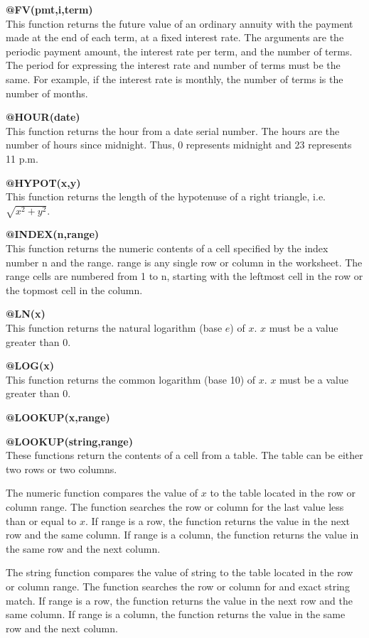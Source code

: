 {\bf @FV(pmt,i,term)}\\
    This function returns the future value of an ordinary annuity with the 
payment made at the end of each term, at a fixed interest rate.  The arguments 
are the periodic payment amount, the interest rate per term, and the number of 
terms.  The period for expressing the interest rate and number of terms must 
be the same.  For example, if the interest rate is monthly, the number of 
terms is the number of months.

{\bf @HOUR(date)}\\
    This function returns the hour from a date serial number.  The hours are 
the number of hours since midnight.  Thus, 0 represents midnight and 23 
represents 11 p.m.

{\bf @HYPOT(x,y)}\\
    This function returns the length of the hypotenuse of a right triangle, 
i.e. $\sqrt{x^2 + y^2}$.

{\bf @INDEX(n,range)}\\
    This function returns the numeric contents of a cell specified by the 
index number n and the range.  range is any single row or column in the 
worksheet.  The range cells are numbered from 1 to n, starting with the 
leftmost cell in the row or the topmost cell in the column.
 
{\bf @LN(x)}\\
    This function returns the natural logarithm (base $e$) of $x$.  
    $x$ must be a 
value greater than 0.

{\bf @LOG(x)}\\
    This function returns the common logarithm (base 10) of $x$.  $x$ must be a 
value greater than 0.

{\bf @LOOKUP(x,range)}

{\bf @LOOKUP(string,range)}\\
    These functions return the contents of a cell from a table.  The table can 
be either two rows or two columns.

    The numeric function compares the value of $x$ to the table located in the 
row or column range.  The function searches the row or column for the last 
value less than or equal to $x$.  If range is a row, the function returns the 
value in the next row and the same column.  If range is a column, the function 
returns the value in the same row and the next column.

    The string function compares the value of string to the table located in 
the row or column range.  The function searches the row or column for and 
exact string match.  If range is a row, the function returns the value in the 
next row and the same column.  If range is a column, the function returns the 
value in the same row and the next column.

